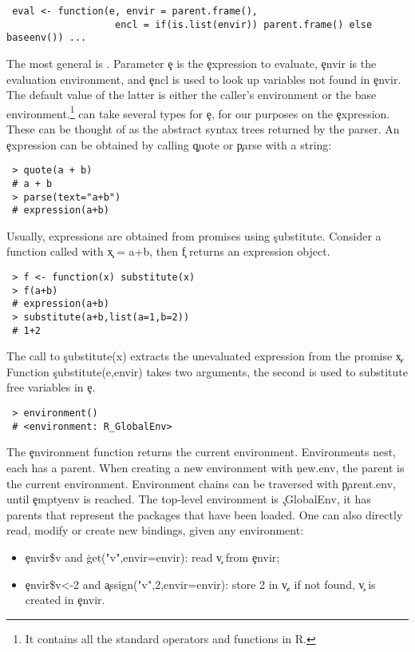 \documentclass[review,screen,acmsmall,anonymous=true]{acmart}
\begin{document}
\begin{lstlisting}
 eval <- function(e, envir = parent.frame(),
                   encl = if(is.list(envir)) parent.frame() else baseenv()) ...
\end{lstlisting}
The most general is \eval. Parameter \c e is the \c{expression} to evaluate,
\c{envir} is the evaluation environment, and \c{encl} is used to look up
variables not found in \c{envir}. The default value of the latter is either the
caller's environment or the base environment.\footnote{It contains all the standard operators and functions in R.} \Eval can take several types for \c e, for
our purposes on the \c{expression}. These can be thought of as the abstract
syntax trees returned by the parser. An \c{expression} can be obtained by
calling \c{quote} or \c{parse} with a string:
\begin{lstlisting}
 > quote(a + b)
 # a + b
 > parse(text="a+b")
 # expression(a+b)
\end{lstlisting}
Usually, expressions are obtained from promises using \c{substitute}. Consider a
function called with \c{x = a+b}, then \c f returns an expression object.
\begin{lstlisting}
 > f <- function(x) substitute(x)
 > f(a+b)
 # expression(a+b)
 > substitute(a+b,list(a=1,b=2))
 # 1+2
\end{lstlisting}
The call to \c{substitute(x)} extracts the unevaluated expression from the
promise \c x. Function \c{substitute(e,envir)} takes two arguments, the second
is used to substitute free variables in \c e.
\begin{lstlisting}
 > environment()
 # <environment: R_GlobalEnv>
\end{lstlisting}
The \c{environment} function returns the current environment. Environments nest,
each has a parent. When creating a new environment with \c{new.env}, the parent
is the current environment. Environment chains can be traversed with
\c{parent.env}, until \c{emptyenv} is reached. The top-level environment is
\c{.GlobalEnv}, it has parents that represent the packages that have been
loaded. One can also directly read, modify or create new bindings, given any
environment:
\begin{itemize}
\item \c{envir\$v} and \c{get("v",envir=envir)}: read  \c{v} from \c{envir};
\item \c{envir\$v<-2} and \c{assign("v",2,envir=envir)}: store 2 in \c{v}, if
  not found, \c{v} is created in \c{envir}.
\end{itemize}
\end{document}
